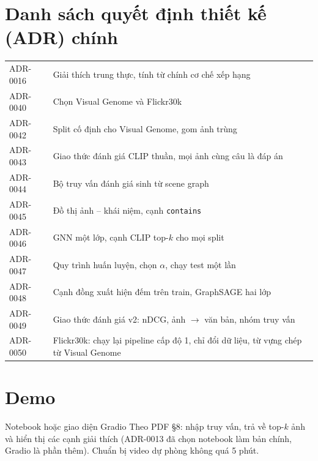 \documentclass[12pt, a4paper]{article}
\newcommand{\code}[1]{\texttt{#1}}
\begin{document}
\section{Danh sách quyết định thiết kế (ADR) chính}
\begin{table}[H]
\centering\small
\begin{tabularx}{\linewidth}{l X}
\toprule
ADR-0016 & Giải thích trung thực, tính từ chính cơ chế xếp hạng \\
ADR-0040 & Chọn Visual Genome và Flickr30k \\
ADR-0042 & Split cố định cho Visual Genome, gom ảnh trùng \\
ADR-0043 & Giao thức đánh giá CLIP thuần, mọi ảnh cùng câu là đáp án \\
ADR-0044 & Bộ truy vấn đánh giá sinh từ scene graph \\
ADR-0045 & Đồ thị ảnh -- khái niệm, cạnh \code{contains} \\
ADR-0046 & GNN một lớp, cạnh CLIP top-$k$ cho mọi split \\
ADR-0047 & Quy trình huấn luyện, chọn $\alpha$, chạy test một lần \\
ADR-0048 & Cạnh đồng xuất hiện đếm trên train, GraphSAGE hai lớp \\
ADR-0049 & Giao thức đánh giá v2: nDCG, ảnh $\to$ văn bản, nhóm truy vấn \\
ADR-0050 & Flickr30k: chạy lại pipeline cấp độ 1, chỉ đổi dữ liệu, từ vựng chép từ Visual Genome \\
\bottomrule
\end{tabularx}
\end{table}

\section{Demo}
\begin{chualam}{Notebook hoặc giao diện Gradio}
Theo PDF §8: nhập truy vấn, trả về top-$k$ ảnh và hiển thị các cạnh giải thích (ADR-0013 đã chọn notebook làm bản chính, Gradio là phần thêm). Chuẩn bị video dự phòng không quá 5 phút.
\end{chualam}
\end{document}
